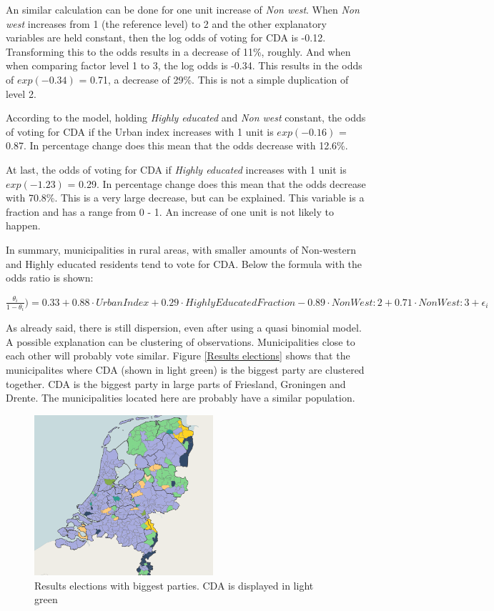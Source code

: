 \documentclass[11pt,]{article}
\begin{document}
An similar calculation can be done for one unit increase of \emph{Non
west}. When \emph{Non west} increases from 1 (the reference level) to 2
and the other explanatory variables are held constant, then the log odds
of voting for CDA is -0.12. Transforming this to the odds results in a
decrease of 11\%, roughly. And when when comparing factor level 1 to 3,
the log odds is -0.34. This results in the odds of \(exp(-0.34)\) =
0.71, a decrease of 29\%. This is not a simple duplication of level 2.

According to the model, holding \emph{Highly educated} and \emph{Non
west} constant, the odds of voting for CDA if the Urban index increases
with 1 unit is \(exp(-0.16)\) = 0.87. In percentage change does this
mean that the odds decrease with 12.6\%.

At last, the odds of voting for CDA if \emph{Highly educated} increases
with 1 unit is \(exp(-1.23)\) = 0.29. In percentage change does this
mean that the odds decrease with 70.8\%. This is a very large decrease,
but can be explained. This variable is a fraction and has a range from 0
- 1. An increase of one unit is not likely to happen.

In summary, municipalities in rural areas, with smaller amounts of
Non-western and Highly educated residents tend to vote for CDA. Below
the formula with the odds ratio is shown:

\(\frac{\theta_i}{1 - \theta_i}) = 0.33 + 0.88 \cdot UrbanIndex + 0.29 \cdot HighlyEducatedFraction - 0.89 \cdot NonWest:2 + 0.71 \cdot NonWest:3 + \epsilon_i\)

As already said, there is still dispersion, even after using a quasi
binomial model. A possible explanation can be clustering of
observations. Municipalities close to each other will probably vote
similar. Figure \ref{Results elections} shows that the municipalites
where CDA (shown in light green) is the biggest party are clustered
together. CDA is the biggest party in large parts of Friesland,
Groningen and Drente. The municipalities located here are probably have
a similar population.

\begin{figure}
\centering
\includegraphics[width=2.60417in]{Uitslag_verkiezingen2017.png}
\caption{Results elections with biggest parties. CDA is displayed in
light green}
\end{figure}
\end{document}
